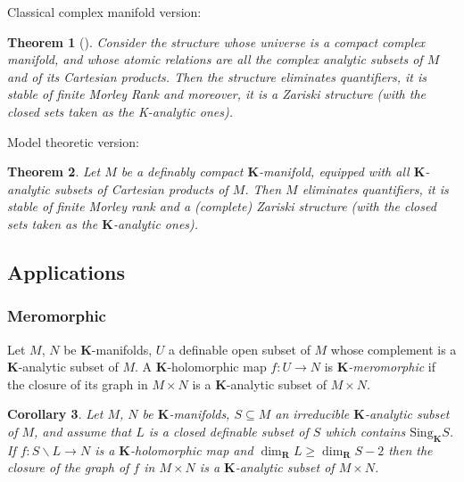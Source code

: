 \documentclass{amsart}
\newtheorem{theorem}{Theorem}[subsection]
\newtheorem{corollary}[theorem]{Corollary}
\theoremstyle{definition}
\numberwithin{equation}{section}
\begin{document}
Classical complex manifold version:
\begin{theorem}[{\cite{zbMATH00554994}}]
	Consider the structure whose universe is a compact complex manifold,
	and whose atomic relations are all the complex analytic subsets of $M$ and of its Cartesian products.
	Then the structure eliminates quantifiers,
	it is stable of finite Morley Rank and moreover,
	it is a Zariski structure
	(with the closed sets taken as the K-analytic ones).
\end{theorem}

Model theoretic version:
\begin{theorem}
	Let $M$ be a definably compact $\mathbf{K}$-manifold,
	equipped with all $\mathbf{K}$-analytic subsets of Cartesian products of $M$.
	Then $M$ eliminates quantifiers,
	it is stable of finite Morley rank and a (complete) Zariski structure
	(with the closed sets taken as the $\mathbf{K}$-analytic ones).
\end{theorem}

\subsection{Applications}
\subsubsection{Meromorphic}
Let $M$, $N$ be $\mathbf{K}$-manifolds,
$U$ a definable open subset of $M$
whose complement is a $\mathbf{K}$-analytic subset of $M$.
A $\mathbf{K}$-holomorphic map $f: U \to N$ is
\emph{$\mathbf{K}$-meromorphic} if the closure of its graph in $M \times N$
is a $\mathbf{K}$-analytic subset of $M \times N$.

\begin{corollary}
	Let $M$, $N$ be $\mathbf{K}$-manifolds,
	$S \subseteq M$ an irreducible $\mathbf{K}$-analytic subset of $M$,
	and assume that $L$ is a closed definable subset of $S$ which contains $\mathrm{Sing}_{\mathbf{K}}S$.
	If $f: S \backslash L \to N$ is a $\mathbf{K}$-holomorphic map and
	$\dim_{\mathbf{R}}L \ge \dim_{\mathbf{R}}S -2$ then
	the closure of the graph of $f$ in $M \times N$ is a $\mathbf{K}$-analytic subset of $M \times N$.
\end{corollary}
\end{document}
